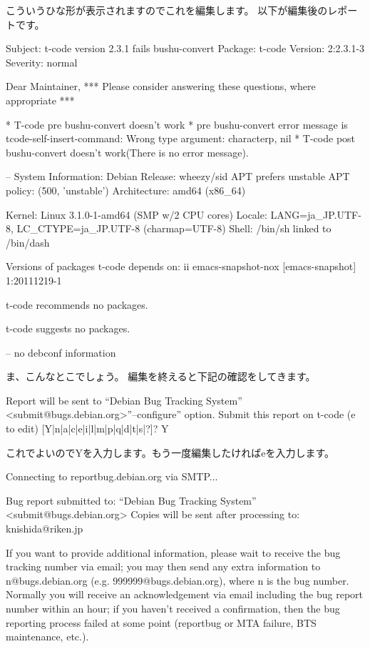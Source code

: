 \documentclass[mingoth,a4paper]{jsarticle}
\begin{document}
こういうひな形が表示されますのでこれを編集します。
以下が編集後のレポートです。

\begin{commandline}
Subject: t-code version 2.3.1 fails bushu-convert
Package: t-code
Version: 2:2.3.1-3
Severity: normal

Dear Maintainer,
*** Please consider answering these questions, where appropriate ***

   * T-code pre bushu-convert doesn't work
   * pre bushu-convert error message is tcode-self-insert-command: Wrong type argument: characterp, nil
   * T-code post bushu-convert doesn't work(There is no error message).

-- System Information:
Debian Release: wheezy/sid
  APT prefers unstable
  APT policy: (500, 'unstable')
Architecture: amd64 (x86_64)

Kernel: Linux 3.1.0-1-amd64 (SMP w/2 CPU cores)
Locale: LANG=ja_JP.UTF-8, LC_CTYPE=ja_JP.UTF-8 (charmap=UTF-8)
Shell: /bin/sh linked to /bin/dash

Versions of packages t-code depends on:
ii  emacs-snapshot-nox [emacs-snapshot]  1:20111219-1

t-code recommends no packages.

t-code suggests no packages.

-- no debconf information
\end{commandline}

ま、こんなとこでしょう。
編集を終えると下記の確認をしてきます。

\begin{commandline}
Report will be sent to ``Debian Bug Tracking System'' <submit@bugs.debian.org>''--configure'' option.
Submit this report on t-code (e to edit) [Y|n|a|c|e|i|l|m|p|q|d|t|s|?]? Y
\end{commandline}

これでよいのでYを入力します。もう一度編集したければeを入力します。

\begin{commandline}
Connecting to reportbug.debian.org via SMTP...

Bug report submitted to: ``Debian Bug Tracking System'' <submit@bugs.debian.org>
Copies will be sent after processing to:
  knishida@riken.jp

If you want to provide additional information, please wait to receive the bug tracking number via email;
 you may then send any extra information to n@bugs.debian.org (e.g. 999999@bugs.debian.org), where n is the
bug number. Normally you will receive an acknowledgement via email including the bug report number within
 an hour; if you haven't received a confirmation, then the bug reporting process failed at some point
(reportbug or MTA failure, BTS maintenance, etc.).
\end{commandline}
\end{document}

